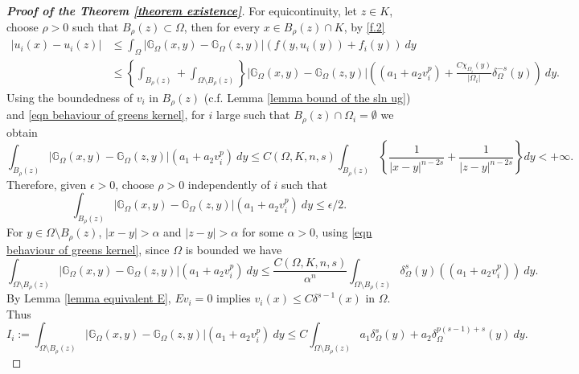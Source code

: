 \documentclass{amsart}
\newcommand{\gk}[1]{\mathbb{G}_{#1}}
\begin{document}
\begin{proof}[\textbf{Proof of the Theorem \ref{theorem existence}}]
 For equicontinuity, let $z\in K$, choose $\rho>0$ such that $B_{\rho}(z)\subset \Omega$, then for every $x\in B_{\rho}(z)\cap K$, by \ref{f.2} 
 \begin{equation*}\label{eqn equacontinuity}
 \begin{split}
     |u_{i}(x)-u_{i}(z)|&\leq \int_{\Omega}|\gk{\Omega}(x,y)-\gk{\Omega}(z,y)|\left(f(y,u_{i}(y))+f_{i}(y)\right)\ dy\\
     &\leq \left\{\int_{B_{\rho}(z)}+\int_{\Omega\setminus B_{\rho}(z)}\right\} |\gk{\Omega}(x,y)-\gk{\Omega}(z,y)|\left((a_{1}+a_{2}v_{i}^{p})+\frac{C\chi_{\Omega_{i}}(y)}{|\Omega_{i}|} \delta_{\Omega}^{-s}(y)\right)\ dy.
 \end{split}
 \end{equation*}
  Using the boundedness of $v_{i}$ in $B_{\rho}(z)$ (c.f. Lemma \ref{lemma bound of the sln ug}) and \eqref{eqn behaviour of greens kernel}, for $i$ large such that $B_{\rho}(z)\cap \Omega_{i}=\emptyset$ we obtain
 \begin{equation*}
     \int_{B_{\rho}(z)}|\gk{\Omega}(x,y)-\gk{\Omega}(z,y)|(a_{1}+a_{2}v_{i}^{p})\ dy\leq C(\Omega, K,n,s)\int_{B_{\rho}(z)}\left\{\frac{1}{|x-y|^{n-2s}}+\frac{1}{|z-y|^{n-2s}}\right\} dy <+\infty.
 \end{equation*}
 Therefore, given $\epsilon>0$, choose $\rho>0$ independently of $i$ such that 
 \begin{equation*}
     \int_{B_{\rho}(z)}|\gk{\Omega}(x,y)-\gk{\Omega}(z,y)|(a_{1}+a_{2}v_{i}^{p})\ dy\leq \epsilon/2.
 \end{equation*}
 For $y\in \Omega\setminus B_{\rho}(z)$, $|x-y|>\alpha$ and $|z-y|>\alpha$ for some $\alpha>0$, using \eqref{eqn behaviour of greens kernel}, since $\Omega$ is bounded we have
 \begin{equation*}
        \int_{\Omega\setminus B_{\rho}(z)}|\gk{\Omega}(x,y)-\gk{\Omega}(z,y)|(a_{1}+a_{2}v_{i}^{p})\ dy\leq \frac{C(\Omega,K,n,s)}{\alpha^{n}}\int_{\Omega\setminus B_{\rho}(z)}\delta_{\Omega}^{s}(y)\left((a_{1}+a_{2}v_{i}^{p})\right)\ dy.
 \end{equation*}
By Lemma \ref{lemma equivalent E}, $Ev_{i}=0$ implies %
$v_{i}(x)\leq C \delta^{s-1}(x)$ in  $\Omega$. Thus 
\begin{equation*}
    I_{i}:=\int_{\Omega\setminus B_{\rho}(z)}|\gk{\Omega}(x,y)-\gk{\Omega}(z,y)|(a_{1}+a_{2}v_{i}^{p})\ dy\leq C\int_{\Omega\setminus B_{\rho}(z)} a_{1}\delta_{\Omega}^{s}(y)+a_{2}\delta_{\Omega}^{p(s-1)+s}(y)\ dy.

\end{equation*}
\end{proof}
\end{document}
